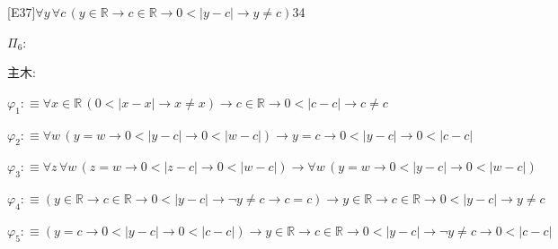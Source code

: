 \begin{fullproof}{[E37]}{$\forall y\,\forall c\,(y \in \mathbb{R} \to c \in \mathbb{R} \to 0 < \lvert y - c \rvert \to y \neq c)$}{34}
\begin{ptree}
\noLine
{}
\end{ptree}
\noindent$\Pi_{6}$:
\begin{ptree}
\noLine
{}
\end{ptree}
\noindent 主木:
\begin{ptree}
\noLine
{}
\end{ptree}
\begin{abbrevlist}
\item $\varphi_{1} :\equiv \forall x \in \mathbb{R}\,(0 < \lvert x - x \rvert \to x \neq x) \to c \in \mathbb{R} \to 0 < \lvert c - c \rvert \to c \neq c$
\item $\varphi_{2} :\equiv \forall w\,(y = w \to 0 < \lvert y - c \rvert \to 0 < \lvert w - c \rvert) \to y = c \to 0 < \lvert y - c \rvert \to 0 < \lvert c - c \rvert$
\item $\varphi_{3} :\equiv \forall z\,\forall w\,(z = w \to 0 < \lvert z - c \rvert \to 0 < \lvert w - c \rvert) \to \forall w\,(y = w \to 0 < \lvert y - c \rvert \to 0 < \lvert w - c \rvert)$
\item $\varphi_{4} :\equiv (y \in \mathbb{R} \to c \in \mathbb{R} \to 0 < \lvert y - c \rvert \to \neg y \neq c \to c = c) \to y \in \mathbb{R} \to c \in \mathbb{R} \to 0 < \lvert y - c \rvert \to y \neq c$
\item $\varphi_{5} :\equiv (y = c \to 0 < \lvert y - c \rvert \to 0 < \lvert c - c \rvert) \to y \in \mathbb{R} \to c \in \mathbb{R} \to 0 < \lvert y - c \rvert \to \neg y \neq c \to 0 < \lvert c - c \rvert$

\end{abbrevlist}
\end{fullproof}
